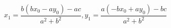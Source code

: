 \documentclass[12pt]{article}
\begin{document}
\[
    x_1 = \frac{b(bx_0 - ay_0) - ac}{a^2 + b^2}, y_1 = \frac{a(-bx_0 + ay_0) - bc}{a^2 + b^2}
\]
\end{document}
